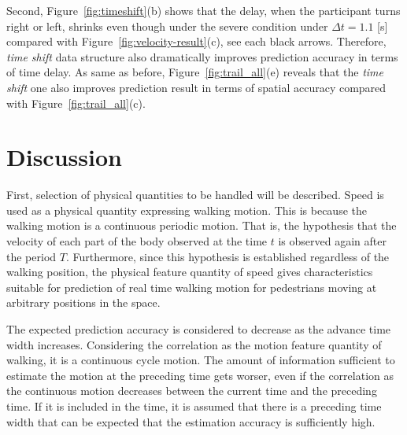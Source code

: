 \documentclass{sigchi}
\begin{document}
Second, Figure~\ref{fig:timeshift}(b) shows that the delay, when the participant turns right or left, shrinks even though under the severe condition under $\Delta t = 1.1$ [s] compared with Figure~\ref{fig:velocity-result}(c), see each black arrows. Therefore, \textit{time shift} data structure also dramatically improves prediction accuracy in terms of time delay. As same as before, Figure~\ref{fig:trail_all}(e) reveals that the \textit{time shift} one also improves prediction result in terms of spatial accuracy compared with Figure~\ref{fig:trail_all}(c).  


\section{Discussion}

First, selection of physical quantities to be handled will be described. Speed is used as a physical quantity expressing walking motion. This is because the walking motion is a continuous periodic motion. That is, the hypothesis that the velocity of each part of the body observed at the time $ t $ is observed again after the period $ T $. Furthermore, since this hypothesis is established regardless of the walking position, the physical feature quantity of speed gives characteristics suitable for prediction of real time walking motion for pedestrians moving at arbitrary positions in the space.

The expected prediction accuracy is considered to decrease as the advance time width increases. Considering the correlation as the motion feature quantity of walking, it is a continuous cycle motion. The amount of information sufficient to estimate the motion at the preceding time gets worser, even if the correlation as the continuous motion decreases between the current time and the preceding time. If it is included in the time, it is assumed that there is a preceding time width that can be expected that the estimation accuracy is sufficiently high. 
\end{document}
